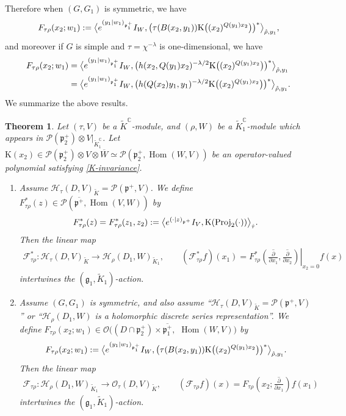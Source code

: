 \documentclass[11pt]{article}
\numberwithin{equation}{section}
\newtheorem{Theorem}{Theorem}[section]
\newcommand{\BC}{\mathbb{C}}
\newcommand{\fg}{\mathfrak{g}}
\newcommand{\fp}{\mathfrak{p}}
\newcommand{\cF}{\mathcal{F}}
\newcommand{\cH}{\mathcal{H}}
\newcommand{\cO}{\mathcal{O}}
\newcommand{\cP}{\mathcal{P}}
\newcommand{\rK}{\mathrm{K}}
\newcommand{\Hom}{\operatorname{Hom}}
\newcommand{\Proj}{\operatorname{Proj}}
\begin{document}
Therefore when $(G,G_1)$ is symmetric, we have
\begin{gather*}
 F_{\tau\rho}(x_2;w_1)
:=\big\langle {\rm e}^{(y_1|w_1)_{\fp^+_1}}I_W,\bigl(\tau(B(x_2,y_1))\rK\big((x_2)^{Q(y_1)x_2}\big) \bigr)^*\big\rangle_{\hat{\rho},y_1},
\end{gather*}
and moreover if $G$ is simple and $\tau=\chi^{-\lambda}$ is one-dimensional, we have
\begin{align*}
F_{\tau\rho}(x_2;w_1)&=\big\langle {\rm e}^{(y_1|w_1)_{\fp^+_1}}I_W,
\big(h(x_2,Q(y_1)x_2)^{-\lambda/2}\rK\big((x_2)^{Q(y_1)x_2}\big)\big)^*\big\rangle_{\hat{\rho},y_1}\\
&=\big\langle {\rm e}^{(y_1|w_1)_{\fp^+_1}}I_W,
\big(h(Q(x_2)y_1,y_1)^{-\lambda/2}\rK\big((x_2)^{Q(y_1)x_2}\big)\big)^*\big\rangle_{\hat{\rho},y_1}.
\end{align*}
We summarize the above results.
\begin{Theorem}\label{main}
Let $(\tau,V)$ be a $\tilde{K}^\BC$-module, and $(\rho,W)$ be a $\tilde{K}_1^\BC$-module
which appears in $\cP(\fp^+_2)\otimes V|_{\tilde{K}_1^\BC}$.
Let $\rK(x_2)\in \cP(\fp^+_2)\otimes V\otimes\overline{W}\simeq\cP(\fp^+_2,\Hom(W,V))$ be an operator-valued polynomial
satisfying \eqref{K-invariance}.
\begin{enumerate}\itemsep=0pt
\item[$(1)$] Assume $\cH_\tau(D,V)_{\tilde{K}}=\cP(\fp^+,V)$.
We define $F_{\tau\rho}^*(z)\in\cP(\overline{\fp^+},\Hom(V,W))$ by
\begin{gather*} F_{\tau\rho}^*(z)=F_{\tau\rho}^*(z_1,z_2):=\big\langle {\rm e}^{(\cdot|z)_{\fp^+}}I_V,\rK(\Proj_2(\cdot))\big\rangle_{\hat{\tau}}. \end{gather*}
Then the linear map
\begin{gather*}
\cF_{\tau\rho}^*\colon \cH_\tau(D,V)_{\tilde{K}}\to\cH_\rho(D_1,W)_{\tilde{K}_1}, \qquad
(\cF_{\tau\rho}^*f)(x_1)
=F_{\tau\rho}^*\left.\left(\overline{\frac{\partial}{\partial x_1}},\overline{\frac{\partial}{\partial x_2}}\right)\right|_{x_2=0}f(x)
\end{gather*}
intertwines the $(\fg_1,\tilde{K}_1)$-action.
\item[$(2)$] Assume $(G,G_1)$ is symmetric, and also assume ``$\cH_\tau(D,V)_{\tilde{K}}=\cP(\fp^+,V)$'' or ``$\cH_\rho(D_1,W)$ is
a holomorphic discrete series representation''.
We define $F_{\tau\rho}(x_2;w_1)\in\cO((D\cap\fp^+_2)\times\overline{\fp^+_1},$ $\Hom(W,V))$ by
\begin{gather*}
 F_{\tau\rho}(x_2;w_1)
:=\big\langle {\rm e}^{(y_1|w_1)_{\fp^+_1}}I_W,\bigl(\tau(B(x_2,y_1))\rK\big((x_2)^{Q(y_1)x_2}\big)\bigr)^*\big\rangle_{\hat{\rho},y_1}.
\end{gather*}
Then the linear map
\begin{gather*}
\cF_{\tau\rho}\colon \cH_\rho(D_1,W)_{\tilde{K}_1}\to \cO_\tau(D,V)_{\tilde{K}}, \qquad
(\cF_{\tau\rho}f)(x) =F_{\tau\rho}\left(x_2;\overline{\frac{\partial}{\partial x_1}}\right)f(x_1)
\end{gather*}
intertwines the $(\fg_1,\tilde{K}_1)$-action.
\end{enumerate}
\end{Theorem}
\end{document}
